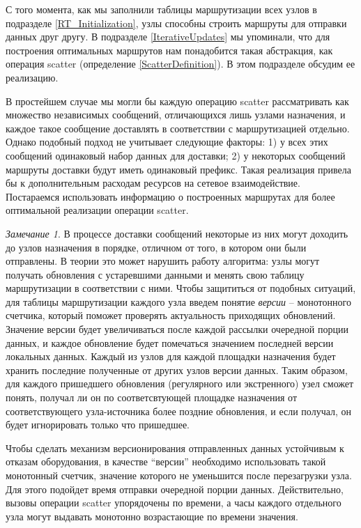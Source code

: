 \documentclass{article}
\theoremstyle{plain}
\theoremstyle{plain}
\theoremstyle{plain}
\theoremstyle{plain}
\theoremstyle{definition}
\theoremstyle{remark}
\newtheorem{remark}{Замечание}[section]
\theoremstyle{plain}
\begin{document}
С того момента, как мы заполнили таблицы маршрутизации всех узлов в подразделе \ref{RT_Initialization}, узлы способны строить маршруты для отправки данных друг другу. В подразделе \ref{IterativeUpdates} мы упоминали, что для построения оптимальных маршрутов нам понадобится такая абстракция, как операция scatter (определение \ref{ScatterDefinition}). В этом подразделе обсудим ее реализацию.

В простейшем случае мы могли бы каждую операцию scatter рассматривать как множество независимых сообщений, отличающихся лишь узлами назначения, и каждое такое сообщение доставлять в соответствии с маршрутизацией отдельно. Однако подобный подход не учитывает следующие факторы: 1) у всех этих сообщений одинаковый набор данных для доставки; 2) у некоторых сообщений маршруты доставки будут иметь одинаковый префикс. Такая реализация привела бы к дополнительным расходам ресурсов на сетевое взаимодействие. Постараемся использовать информацию о построенных маршрутах для более оптимальной реализации операции scatter.

\begin{remark}
\label{message_versions}
    В процессе доставки сообщений некоторые из них могут доходить до узлов назначения в порядке, отличном от того, в котором они были отправлены. В теории это может нарушить работу алгоритма: узлы могут получать обновления с устаревшими данными и менять свою таблицу маршрутизации в соответствии с ними. Чтобы защититься от подобных ситуаций, для таблицы маршрутизации каждого узла введем понятие \textit{версии} -- монотонного счетчика, который поможет проверять актуальность приходящих обновлений. Значение версии будет увеличиваться после каждой рассылки очередной порции данных, и каждое обновление будет помечаться значением последней версии локальных данных. Каждый из узлов для каждой площадки назначения будет хранить последние полученные от других узлов версии данных. Таким образом, для каждого пришедшего обновления (регулярного или экстренного) узел сможет понять, получал ли он по соответсвтующей площадке назначения от соответствующего узла-источника более поздние обновления, и если получал, он будет игнорировать только что пришедшее.
    
    Чтобы сделать механизм версионирования отправленных данных устойчивым к отказам оборудования, в качестве \enquote{версии} необходимо использовать такой монотонный счетчик, значение которого не уменьшится после перезагрузки узла. Для этого подойдет время отправки очередной порции данных. Действительно, вызовы операции scatter упорядочены по времени, а часы каждого отдельного узла могут выдавать монотонно возрастающие по времени значения.
\end{remark}
\end{document}
